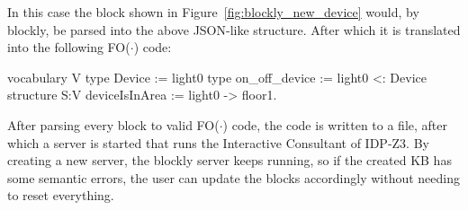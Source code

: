 \documentclass[11pt,a4paper]{report}
\newcommand{\fodot}{FO($\cdot$)\xspace}
\begin{document}
In this case the block shown in Figure~\ref{fig:blockly_new_device} would, by blockly, be parsed into the above JSON-like structure. After which it is translated into the following \fodot code:

\begin{idplisting}
vocabulary V {
    type Device := {light0}
    type on_off_device := {light0} <: Device
}
structure S:V {
    deviceIsInArea := {light0 -> floor1}.
}
\end{idplisting}

After parsing every block to valid \fodot code, the code is written to a file, after which a server is started that runs the Interactive Consultant of IDP-Z3. By creating a new server, the blockly server keeps running, so if the created KB has some semantic errors, the user can update the blocks accordingly without needing to reset everything.
\printbibliography
\end{document}
